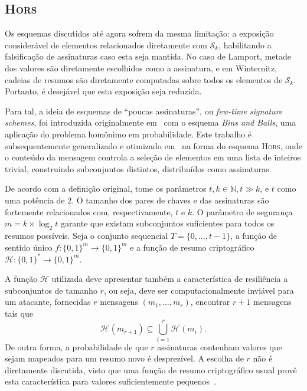 \documentclass{ufsctex/ufsctex}
\newcommand{\hh}{\mathcal{H}}
\newcommand{\sk}{\mathcal{S}_{k}}
\newcommand{\hash}[2][]{\mathcal{H}^{#1} (#2)}
\newcommand{\binwds}[1]{\{0, 1\}^{#1}}
\newcommand{\fhash}[1]{\hh{}: \binwds{*} \longrightarrow{} \binwds{#1}}
\newcommand{\hors}{\textsc{Hors}}
\begin{document}
\subsection{\hors{}}\label{subsection:hors}

Os esquemas discutidos até agora sofrem da mesma limitação: a exposição
considerável de elementos relacionados diretamente com $\sk{}$, habilitando a
falsificação de assinaturas caso esta seja mantida. No caso de Lamport, metade
dos valores são diretamente escolhidos como a assinatura, e em Winternitz,
cadeias de resumos são diretamente computadas sobre todos os elementos de
$\sk{}$. Portanto, é desejável que esta exposição seja reduzida.

Para tal, a ideia de esquemas de ``poucas assinaturas'', ou \emph{few-time
signature schemes}, foi introduzida originalmente
em~\cite{Perrig:inproc:2001:nov} com o esquema \emph{Bins and Balls}, uma
aplicação do problema homônimo em probabilidade. Este trabalho é
subsequentemente generalizado e otimizado em~\cite{Reyzin:inproc:2002:jul} na
forma do esquema \hors{}\sigla{\hors{}}{\emph{Hash to Obtain Random Subset}},
onde o conteúdo da mensagem controla a seleção de elementos em uma lista de
inteiros trivial, construindo subconjuntos distintos, distribuídos como
assinaturas.

De acordo com a definição original, tome os parâmetros $t, k \in \mathbb{N}, t
\gg k$, e $t$ como uma potência de 2. O tamanho
dos pares de chaves e das assinaturas são fortemente relacionados com,
respectivamente, $t$ e $k$. O parâmetro de segurança $m = k \times \log_2 t$
garante que existam subconjuntos suficientes para todos os resumos possíveis.
Seja o conjunto sequencial $T = \{0, \dots, t - 1\}$, a função de sentido único $f
: \binwds{m} \longrightarrow \binwds{m}$ e a função de resumo criptográfico
$\fhash{m}$.

A função $\hh{}$ utilizada deve apresentar também a característica de
resiliência a subconjuntos de tamanho $r$, ou seja, deve ser computacionalmente
inviável para um atacante, fornecidas $r$ mensagens $(m_{1}, \dots, m_{r})$,
encontrar $r + 1$ mensagens tais que
\begin{equation}
  \hash{m_{r + 1}} \subseteq \bigcup^{r}_{i = 1} \hash{m_{i}}.
\end{equation}
De outra forma, a probabilidade de que $r$ assinaturas contenham valores que
sejam mapeados para um resumo novo é desprezível. A escolha de $r$ não é
diretamente discutida, visto que uma função de resumo criptográfico usual provê
esta característica para valores suficientemente pequenos~\cite[Apêndice
A]{Reyzin:inproc:2002:jul}.
\end{document}
